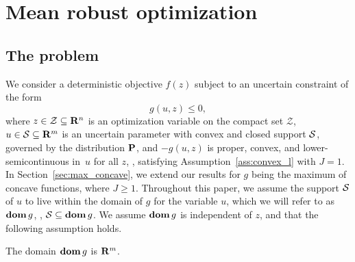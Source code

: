 \section{Mean robust optimization}%
\label{sec:mro}
\subsection{The problem}
\label{sec:intro}
We consider a deterministic objective $f(z)$ subject to an uncertain constraint of the form
\begin{equation}
	\label{eq:constr_original}
	g(u,z) \le 0,
\end{equation}
where $z \in \mathcal{Z} \subseteq {\mathbf R}^n$ is an optimization variable on the compact set $\mathcal{Z}$, $u \in \mathcal{S} \subseteq {\mathbf R}^m$ is an uncertain parameter with convex and closed support $\mathcal{S}$, governed by the distribution ${\mathbf P}$, and $-g(u, z)$ is proper, convex, and lower-semicontinuous in~$u$ for all $z$, \ie, satisfying Assumption~\ref{ass:convex_l} with $J = 1$.  In Section~\ref{sec:max_concave}, we extend our results for $g$ being the maximum of concave functions, where $J \geq 1$.
Throughout this paper, we assume the support $\mathcal{S}$ of $u$ to live within the domain of $g$ for the variable $u$, which we will refer to as $\mathop{\bf dom}{g}$, \ie, $\mathcal{S} \subseteq \mathop{\bf dom}{g}$.
We assume $\mathop{\bf dom}{g}$ is independent of $z$, and that the following assumption holds. 
\begin{assumption}
	\label{assp:dom}
	The domain $\mathop{\bf dom}{g}$ is ${\mathbf R}^m$. 
\end{assumption}



